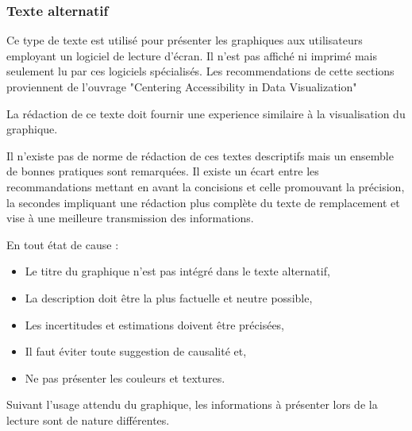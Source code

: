 \documentclass[a4paper,12pt]{article}
\begin{document}
\begin{multicols}{2}
\subsubsection{Texte alternatif}
\label{sec:org51df131}
Ce type de texte est utilisé pour présenter les graphiques aux utilisateurs employant un logiciel de lecture d'écran. Il n'est pas affiché ni imprimé mais seulement lu par ces logiciels spécialisés.
Les recommendations de cette sections proviennent de l'ouvrage "Centering Accessibility in Data Visualization" \autocite{schwabishNotHarmGuide2022}

La rédaction de ce texte doit fournir une experience similaire à la visualisation du graphique.

Il n'existe pas de norme de rédaction de ces textes descriptifs mais un ensemble de bonnes pratiques sont remarquées. Il existe un écart entre les recommandations mettant en avant la concisions et celle promouvant la précision, la secondes impliquant une rédaction plus complète du texte de remplacement et vise à une meilleure transmission des informations.

En tout état de cause :
\begin{itemize}
\item Le titre du graphique n'est pas intégré dans le texte alternatif,
\item La description doit être la plus factuelle et neutre possible,
\item Les incertitudes et estimations doivent être précisées,
\item Il faut éviter toute suggestion de causalité et,
\item Ne pas présenter les couleurs et textures.
\end{itemize}

Suivant l'usage attendu du graphique, les informations à présenter lors de la lecture sont de nature différentes.


\end{multicols}
\end{document}
